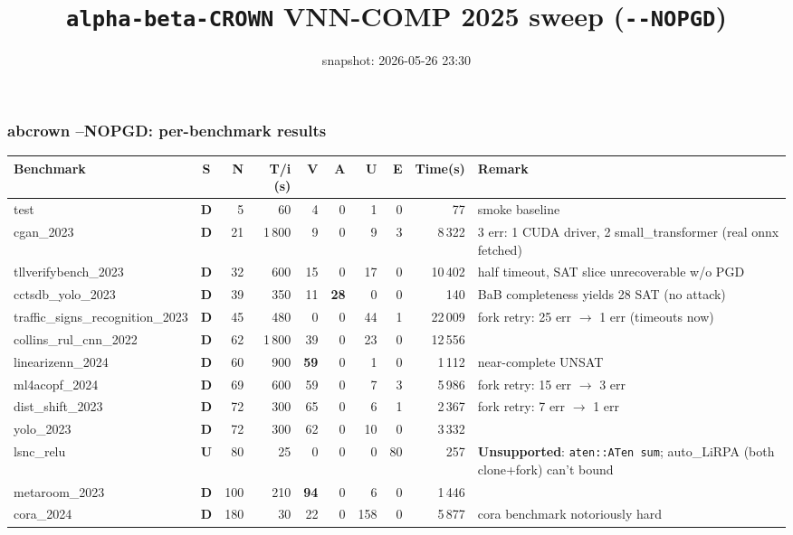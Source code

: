 \documentclass[10pt]{beamer}
\title{\large \texttt{alpha-beta-CROWN} VNN-COMP 2025 sweep (\texttt{-{}-NOPGD})}
\date{snapshot: 2026-05-26 23:30}
\newcommand{\sdone}{{\color{cdone}\textbf{D}}}
\newcommand{\sunsup}{{\color{cunsup}\textbf{U}}}
\begin{document}
\begin{frame}[fragile]
\frametitle{abcrown --NOPGD: per-benchmark results}

\centering\tiny
\setlength{\tabcolsep}{3pt}
\begin{tabular}{l c r r r r r r r l}
\toprule
\textbf{Benchmark} & \textbf{S} & \textbf{N} & \textbf{T/i (s)} & \textbf{V} & \textbf{A} & \textbf{U} & \textbf{E} & \textbf{Time(s)} & \textbf{Remark} \\
\midrule
test                            & \sdone  & 5    & 60   & 4    & 0   & 1   & 0   & 77      & smoke baseline \\
cgan\_2023                      & \sdone  & 21   & 1\,800 & 9  & 0   & 9   & 3   & 8\,322  & 3 err: 1 CUDA driver, 2 small\_transformer (real onnx fetched) \\
tllverifybench\_2023            & \sdone  & 32   & 600  & 15   & 0   & 17  & 0   & 10\,402 & half timeout, SAT slice unrecoverable w/o PGD \\
cctsdb\_yolo\_2023              & \sdone  & 39   & 350  & 11   & \textbf{28} & 0 & 0 & 140 & BaB completeness yields 28 SAT (no attack) \\
traffic\_signs\_recognition\_2023 & \sdone & 45 & 480  & 0    & 0   & 44  & 1   & 22\,009 & fork retry: 25 err $\to$ 1 err (timeouts now) \\
collins\_rul\_cnn\_2022         & \sdone  & 62   & 1\,800 & 39 & 0   & 23  & 0   & 12\,556 & \\
linearizenn\_2024               & \sdone  & 60   & 900  & \textbf{59} & 0 & 1 & 0 & 1\,112 & near-complete UNSAT \\
ml4acopf\_2024                  & \sdone  & 69   & 600  & 59   & 0   & 7   & 3   & 5\,986  & fork retry: 15 err $\to$ 3 err \\
dist\_shift\_2023               & \sdone  & 72   & 300  & 65   & 0   & 6   & 1   & 2\,367  & fork retry: 7 err $\to$ 1 err \\
yolo\_2023                      & \sdone  & 72   & 300  & 62   & 0   & 10  & 0   & 3\,332  & \\
lsnc\_relu                      & \sunsup & 80   & 25   & 0    & 0   & 0   & 80  & 257     & \textbf{Unsupported}: \texttt{aten::ATen sum}; auto\_LiRPA (both clone+fork) can't bound \\
metaroom\_2023                  & \sdone  & 100  & 210  & \textbf{94} & 0 & 6 & 0 & 1\,446 & \\
cora\_2024                      & \sdone  & 180  & 30   & 22   & 0   & 158 & 0  & 5\,877  & cora benchmark notoriously hard \\

\end{tabular}
\end{frame}
\end{document}
